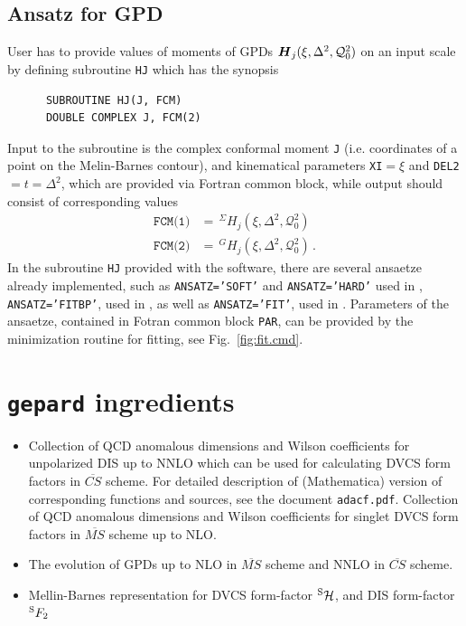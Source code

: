 \documentclass[12pt]{article}
\begin{document}
\subsection{Ansatz for GPD}
\label{ssect:ansatz}

User has to provide values of moments of GPDs $\mbox{\boldmath $H$}_{j} 
(\xi,\Delta^2,\mathcal{Q}_{0}^2)$
on an input scale by defining subroutine \texttt{HJ} which has the synopsis
\begin{verbatim}
      SUBROUTINE HJ(J, FCM)
      DOUBLE COMPLEX J, FCM(2)
\end{verbatim}
Input to the subroutine is the complex conformal moment \texttt{J} (i.e. coordinates of a point
on the Melin-Barnes contour), and kinematical parameters \texttt{XI}$=\xi$ and
\texttt{DEL2}$=t=\Delta^2$, which are provided via Fortran common block,
while output should consist of corresponding values
\begin{align}
\texttt{FCM(1)}& =\, ^{\Sigma}\!H_{j} (\xi,\Delta^2,\mathcal{Q}_{0}^2)  \\
\texttt{FCM(2)}& =\, ^{G}\!H_{j}(\xi,\Delta^2,\mathcal{Q}_{0}^2) \,.
\label{eq:FCM}
\end{align}
In the subroutine \texttt{HJ} provided with the software, there are several ansaetze 
already implemented, such as \texttt{ANSATZ='SOFT'} and \texttt{ANSATZ='HARD'}
used in \cite{Kumericki:2006xx}, \texttt{ANSATZ='FITBP'}, used in
\cite{Kumericki:2007sa}, as well as \texttt{ANSATZ='FIT'}, used in
\cite{Kumericki:2009uq}.
Parameters of the ansaetze, contained in Fotran common block \texttt{PAR}, can
be provided by the minimization routine for fitting, see
Fig.~\ref{fig:fit.cmd}.


\section{\texttt{gepard} ingredients}

\begin{itemize}
\item Collection of QCD anomalous dimensions and Wilson coefficients for
unpolarized DIS up to NNLO which can be used for calculating DVCS form factors
in $\overline{CS}$ scheme. For detailed description of (Mathematica) version of
corresponding functions and sources, see the document \texttt{adacf.pdf}.
Collection of QCD anomalous dimensions and Wilson coefficients for singlet DVCS form factors
in $\overline{MS}$ scheme up to NLO.

\item
The evolution of GPDs up to NLO in $\overline{MS}$ scheme 
and  NNLO in $\overline{CS}$ scheme.

\item 
Mellin-Barnes representation for DVCS form-factor ${ }^{\rm S}\mathcal{H}$, and
DIS form-factor ${}^{\rm S}F_2$
\end{itemize}
\end{document}
